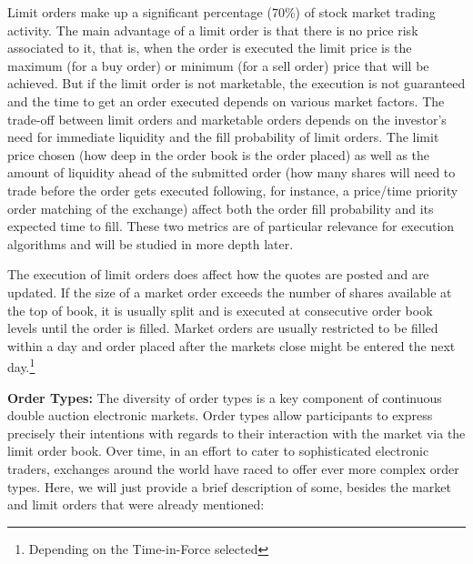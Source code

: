 Limit orders make up a significant percentage (70\%) of stock market trading activity. The main advantage of a limit order is that there is no price risk associated to it, that is, when the order is executed the limit price is the maximum (for a buy order) or minimum (for a sell order) price that will be achieved. But if the limit order is not marketable, the execution is not guaranteed and the time to get an order executed depends on various market factors. The trade-off between limit orders and marketable orders depends on the investor's need for immediate liquidity and the fill probability of limit orders. The limit price chosen (how deep in the order book is the order placed) as well as the amount of liquidity ahead of the submitted order (how many shares will need to trade before the order gets executed following, for instance, a price/time priority order matching of the exchange) affect both the order fill probability and its expected time to fill. These two metrics are of particular relevance for execution algorithms and will be studied in more depth later. 


The execution of limit orders does affect how the quotes are posted and are updated. If the size of a market order exceeds the number of shares available at the top of book, it is usually split and is executed at consecutive order book levels until the order is filled. Market orders are usually restricted to be filled within a day and order placed after the markets close might be entered the next day.\footnote{Depending on the Time-in-Force selected} \twomedskip


\noindent\textbf{Order Types:} The diversity of order types is a key component of continuous double auction electronic markets. Order types allow participants to express precisely their intentions with regards to their interaction with the market via the limit order book. Over time, in an effort to cater to sophisticated electronic traders, exchanges around the world have raced to offer ever more complex order types. Here, we will just provide a brief description of some, besides the market and limit orders that were already mentioned:

